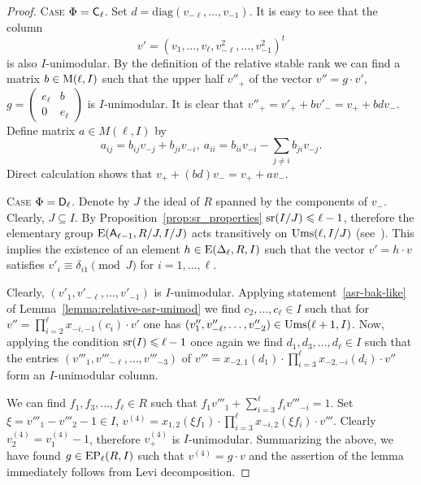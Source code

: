 \begin{proof} 
\textsc{Case $\Phi=\mathsf{C}_\ell$.}
Set $d =\mathrm{diag}(v_{-\ell},\ldots,v_{-1}).$
It is easy to see that the column $$v'=(v_1,\ldots,v_\ell, v_{-\ell}^2,\ldots,v_{-1}^2)^t$$ is also $I$-unimodular.
By the definition of the relative stable rank we can find a matrix $b\in \operatorname{M}(\ell,I)$
such that the upper half $v''_+$ of the vector $v''= g \cdot v'$, $g=\left(\begin{smallmatrix} e_\ell & b \\ 0 & e_{\ell} \end{smallmatrix}\right)$ is $I$-unimodular.
It is clear that $v''_+ = v'_+ + b v'_- = v_+ + bd v_-$. Define matrix $a \in M(\ell, I)$ by 
$$a_{ij} = b_{ij} v_{-j} + b_{ji} v_{-i},\ a_{ii} = b_{ii} v_{-i} - \sum\limits_{j\neq i} b_{ji} v_{-j}. $$
Direct calculation shows that $v_+ + (bd)v_- = v_+ + av_-$.


\textsc{Case $\Phi=\mathsf{D}_\ell$.} Denote by $J$ the ideal of $R$ spanned by the components of $v_{-}$. Clearly, $J \subseteq I$.
By Proposition~\ref{prop:sr_properties} $\operatorname{sr}(I/J) \leqslant \ell-1$, therefore
the elementary group $\operatorname{E}(\mathsf{A}_{\ell-1}, R/J, I/J)$ acts transitively on $\operatorname{Ums}(\ell, I/J)$ (see~\cite[Theorem~2.3c]{Va69}). 
This implies the existence of an element $h\in \operatorname{E}(\Delta_\ell, R, I)$ such that the vector $v' = h \cdot v$ satisfies $v'_i \equiv \delta_{i1} \pmod J$ for $i=1,\ldots, \ell$.

Clearly, $(v'_1,v'_{-\ell},\ldots, v'_{-1})$ is $I$-unimodular.
Applying statement~\ref{asr-bak-like} of Lemma~\ref{lemma:relative-asr-unimod} we find $c_2,\ldots, c_\ell\in I$ such that for $v''= \prod_{i=2}^{\ell}x_{-i, -1}(c_i)\cdot v'$ one has
$(v''_1, v''_{-\ell},\ldots, v''_{-2})\in\operatorname{Ums}(\ell+1, I)$.
Now, applying the condition $\operatorname{sr}(I) \leqslant \ell-1$ once again we find
$d_1,d_3,\ldots, d_{\ell}\in I$ such that the entries $(v'''_1, v'''_{-\ell},\ldots, v'''_{-3})$
of $v'''=x_{-2,1}(d_1) \cdot \prod_{i=3}^{\ell} x_{-2,-i}(d_i) \cdot v''$ form an $I$-unimodular column.

We can find $f_1, f_3,\ldots, f_\ell \in R$ such that $f_1v'''_1+\sum_{i=3}^\ell f_i v'''_{-i} = 1$.
Set $\xi = v'''_1-v'''_2-1 \in I$, $v^{(4)}=x_{1,2}(\xi f_1) \cdot \prod_{i=3}^\ell x_{-i,2}(\xi f_i) \cdot v'''$.
Clearly $v^{(4)}_2 = v^{(4)}_1-1$, therefore $v^{(4)}_+$ is $I$-unimodular.
Summarizing the above, we have found $g\in \operatorname{EP}_\ell(R, I)$ such that $v^{(4)}=g \cdot v$
and the assertion of the lemma immediately follows from Levi decomposition. \end{proof}

